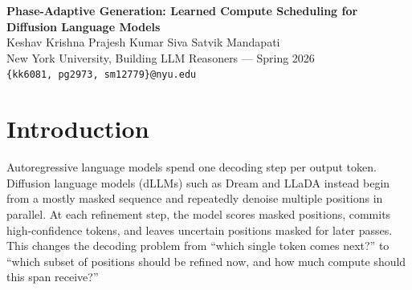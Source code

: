 \documentclass[11pt]{article}
\newcommand{\projectname}{Phase-Adaptive Generation}
\newcommand{\pag}{PAG}
\newcommand{\dllm}{dLLM}
\newcommand{\nfe}{NFE}
\begin{document}
\begin{center}
{\LARGE\bfseries Phase-Adaptive Generation: Learned Compute Scheduling for Diffusion Language Models}\\[0.35em]
{\large Keshav Krishna \quad Prajesh Kumar \quad Siva Satvik Mandapati}\\[0.16em]
{\normalsize New York University, Building LLM Reasoners --- Spring 2026}\\
{\normalsize \texttt{\{kk6081, pg2973, sm12779\}@nyu.edu}}
\end{center}

\begin{abstract}
Diffusion language models decode by iteratively refining masked tokens, which exposes a useful scheduling question: should every part of a reasoning answer receive the same block size and refinement budget? We study this question through \projectname{} (\pag{}), a system for predicting block-level control tuples from generation traces and using them to adapt LLaDA decoding. The project produced three connected contributions. 
First, we built trace-analysis tooling for Dream and LLaDA, including token-level stabilization features, PELT/kernel change-point detection, and a Streamlit inspection interface. 
Second, we converted AdaBlock-style LLaDA traces into block-native training data and compared several next-control predictors, including a regression Transformer, a variable-order Markov baseline, a multi-output random forest, and a classification/ordinal Transformer over rich block features. 
Third, we integrated the learned predictor into a tuple-conditioned LLaDA scheduler and audited it against AdaBlock and history-free controls with corrected forward-pass accounting. On GSM8K, PAG reduced mean \nfe{} by 4.0\% relative to AdaBlock with a 1.6-point accuracy reduction; on MATH-500 it reduced mean \nfe{} by 6.7\% with a 1.3-point accuracy reduction. A size-conditioned lookup policy slightly dominated the learned scheduler on GSM8K, motivating a risk-controlled residual formulation whose frozen cross-model protocol evaluates LLaDA and Dream without test-set tuning.
\end{abstract}

\section{Introduction}

Autoregressive language models spend one decoding step per output token. Diffusion language models (\dllm{}s) such as Dream and LLaDA instead begin from a mostly masked sequence and repeatedly denoise multiple positions in parallel. At each refinement step, the model scores masked positions, commits high-confidence tokens, and leaves uncertain positions masked for later passes. This changes the decoding problem from ``which single token comes next?'' to ``which subset of positions should be refined now, and how much compute should this span receive?''
\end{document}
